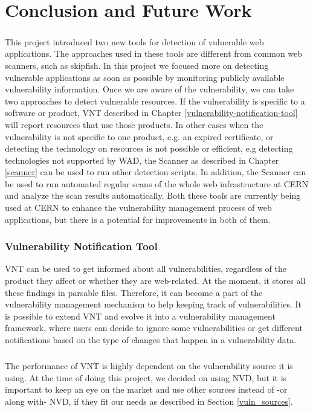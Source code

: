 \chapter{Conclusion and Future Work}
\label{conclusion-and-future-work}
\thispagestyle{empty}
\paragraph{}
This project introduced two new tools for detection of vulnerable web applications. The approaches used in these tools are different from common web scanners, such as skipfish. In this project we focused more on detecting vulnerable applications as soon as possible by monitoring publicly available vulnerability information. Once we are aware of the vulnerability, we can take two approaches to detect vulnerable resources. If the vulnerability is specific to a software or product, VNT described in Chapter \ref{vulnerability-notification-tool} will report resources that use those products. In other cases when the vulnerability is not specific to one product, e.g. an expired certificate, or detecting the technology on resources is not possible or efficient, e.g detecting technologies not supported by WAD, the Scanner as described in Chapter \ref{scanner} can be used to run other detection scripts. In addition, the Scanner can be used to run automated regular scans of the whole web infrastructure at CERN and analyze the scan results automatically. Both these tools are currently being used at CERN to enhance the vulnerability management process of web applications, but there is a potential for improvements in both of them. 
 
\subsection{Vulnerability Notification Tool}
VNT can be used to get informed about all vulnerabilities, regardless of the product they affect or whether they are web-related. At the moment, it stores all these findings in parsable files. Therefore, it can become a part of the vulnerability management mechanism to help keeping track of vulnerabilities. It is possible to extend VNT and evolve it into a vulnerability management framework, where users can decide to ignore some vulnerabilities or get different notifications based on the type of changes that happen in a vulnerability data.
\paragraph{}
The performance of VNT is highly dependent on the vulnerability source it is using. At the time of doing this project, we decided on using NVD,  but it is important to keep an eye on the market and use other sources instead of -or along with- NVD, if they fit our needs as described in Section \ref{vuln_sources}. 

